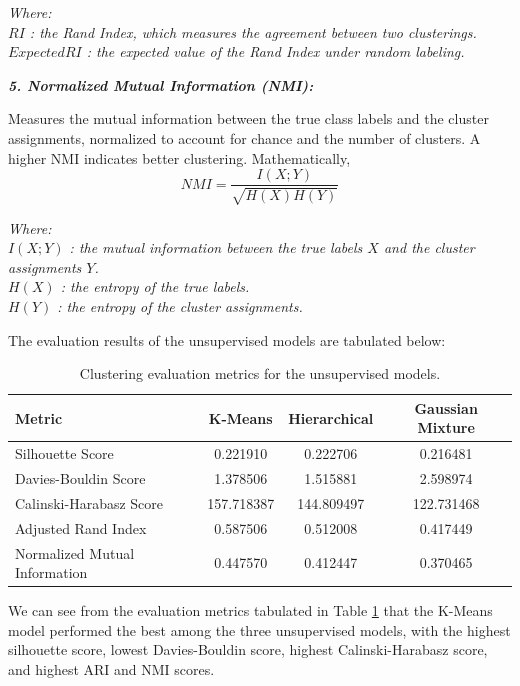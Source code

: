 ﻿\documentclass{article}
\renewcommand{\text}[1]{\mathit{#1}}
\begin{document}
\textit{Where:\\
	$\text{RI}$ : the Rand Index, which measures the agreement between two clusterings.\\
	$\text{Expected RI}$ : the expected value of the Rand Index under random labeling.
}

\textit{\textbf{5. Normalized Mutual Information (NMI):}}

Measures the mutual information between the true class labels and the cluster assignments, normalized to account for chance
and the number of clusters. A higher NMI indicates better clustering. Mathematically,
\begin{equation}
	\mathit{NMI} = \frac{I(X; Y)}{\sqrt{H(X) H(Y)}}
\end{equation}

\textit{Where:\\
	$I(X; Y)$ : the mutual information between the true labels $X$ and the cluster assignments $Y$.\\
	$H(X)$ : the entropy of the true labels.\\
	$H(Y)$ : the entropy of the cluster assignments.
}

The evaluation results of the unsupervised models are tabulated below:

\begin{table}[H]
\centering
\scriptsize
\caption{Clustering evaluation metrics for the unsupervised models.}
\label{tab:unsupervised_metrics}
\begin{tabularx}{\columnwidth}{>{\raggedright\arraybackslash}Xccc}
\toprule
Metric & K-Means & Hierarchical & Gaussian Mixture \\
\midrule
Silhouette Score & 0.221910 & 0.222706 & 0.216481 \\
Davies-Bouldin Score & 1.378506 & 1.515881 & 2.598974 \\
Calinski-Harabasz Score & 157.718387 & 144.809497 & 122.731468 \\
Adjusted Rand Index & 0.587506 & 0.512008 & 0.417449 \\
Normalized Mutual Information & 0.447570 & 0.412447 & 0.370465 \\
\bottomrule
\end{tabularx}
\end{table}

We can see from the evaluation metrics tabulated in Table \ref{tab:unsupervised_metrics} that the K-Means model performed the best among the three unsupervised models, with the highest silhouette score, lowest Davies-Bouldin score, highest Calinski-Harabasz score, and highest ARI and NMI scores.
\end{document}
